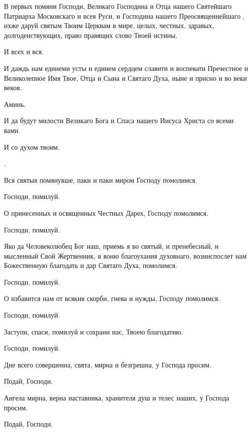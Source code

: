 \begin{mymulticols}
 В первых помяни Господи, Великаго Господина и Отца нашего   Святейшаго Патриарха Московскаго и всея Руси, и Господина нашего Преосвященнейшаго , ихже даруй святым Твоим Церквам в мире, целых, честных, здравых, долгоденствующих, право правящих слово Твоей истины. 

 И всех и вся.

 И даждь нам единеми усты и единем сердцем славити и воспевати Пречестное и Великолепное Имя Твое, Отца и Сына и Святаго Духа, ныне и присно и во веки веков. 

 Аминь.

 И да будут милости Великаго Бога и Спаса нашего Иисуса Христа со всеми вами.

 И со духом твоим.

. 


 Вся святыя помянувше, паки и паки миром Господу помолимся. 

 Господи, помилуй.

 О принесенных и освященных Честных Дарех, Господу помолимся. 

 Господи, помилуй.

 Яко да Человеколюбец Бог наш, приемь я во святый, и пренебесный, и мысленный Свой Жертвенник, в воню благоухания духовнаго, возниспослет нам Божественную благодать и дар Святаго Духа, помолимся. 

 Господи, помилуй.

 О избавится нам от всякия скорби, гнева и нужды, Господу помолимся. 

 Господи, помилуй.

 Заступи, спаси, помилуй и сохрани нас, Твоею благодатию. 

 Господи, помилуй.

 Дне всего совершенна, свята, мирна и безгрешна, у Господа просим. 

 Подай, Господи.

 Ангела мирна, верна наставника, хранителя душ и телес наших, у Господа просим. 

 Подай, Господи.


\end{mymulticols}
